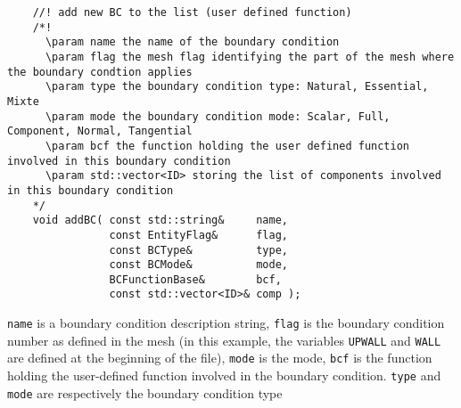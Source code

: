 \begin{verbatim}
    //! add new BC to the list (user defined function)
    /*!
      \param name the name of the boundary condition
      \param flag the mesh flag identifying the part of the mesh where the boundary condtion applies
      \param type the boundary condition type: Natural, Essential, Mixte
      \param mode the boundary condition mode: Scalar, Full, Component, Normal, Tangential
      \param bcf the function holding the user defined function involved in this boundary condition
      \param std::vector<ID> storing the list of components involved in this boundary condition
    */
    void addBC( const std::string&     name,
                const EntityFlag&      flag,
                const BCType&          type,
                const BCMode&          mode,
                BCFunctionBase&        bcf,
                const std::vector<ID>& comp );
\end{verbatim}
\verb!name! is a boundary condition description string,
\verb!flag! is the boundary condition number as defined in the mesh (in this example, the variables \verb+UPWALL+
and \verb+WALL+ are defined at the beginning of the file),
\verb!mode! is the mode, \verb!bcf! is the function holding the user-defined function involved
in the boundary condition. \verb!type! and \verb!mode! are respectively the boundary condition type
